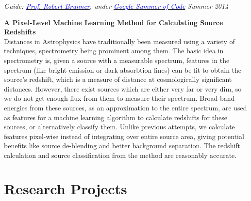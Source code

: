 \documentclass[margin,line]{res}
\newenvironment{list1}{
  \begin{list}{\ding{113}}{%
      \setlength{\itemsep}{0in}
      \setlength{\parsep}{0in} \setlength{\parskip}{0in}
      \setlength{\topsep}{0in} \setlength{\partopsep}{0in} 
      \setlength{\leftmargin}{0.17in}}}{\end{list}}
\begin{document}
\begin{resume}
{\em Guide: \href{hhttp://www.astro.illinois.edu/people/bigdog}{\textcolor{blue}{Prof. Robert Brunner}}, under \href{https://www.google-melange.com/gsoc/homepage/google/gsoc2014}{\textcolor{blue} {Google Summer of Code}}} \hfill {\it Summer 2014}\\
\vspace*{-.13in}
\begin{list1}
\item[]\textbf{A Pixel-Level Machine Learning Method for Calculating Source Redshifts} \\
Distances in Astrophysics have traditionally been measured using a variety of techniques, spectrometry being prominent among them. The basic idea in spectrometry is, given a source with a measurable spectrum, features in the spectrum (like bright emission or dark absorbtion lines) can be fit to obtain the source's redshift, which is a measure of distance at cosmologically significant distances. However, there exist sources which are either very far or very dim, so we do not get enough flux from them to measure their spectrum. Broad-band energies from these sources, as an approximation to the entire spectrum, are used as features for a machine learning algorithm to calculate redshifts for these sources, or alternatively classify them. Unlike previous attempts, we calculate features pixel-wise instead of integrating over entire source area, giving potential benefits like source de-blending and better background separation. The redshift calculation and source classification from the method are reasonably accurate.
\end{list1}

\newpage
\section{\sc Research Projects}


\end{resume}
\end{document}
